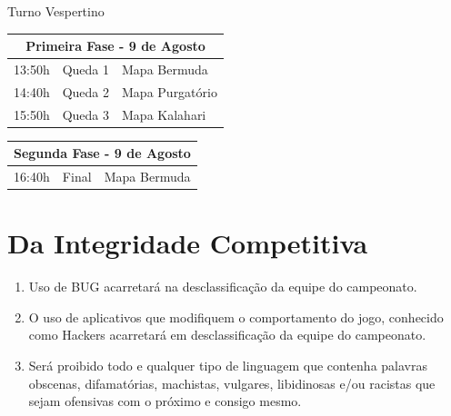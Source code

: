 \begin{enumerate}[start=1,label={\bfseries Art. \arabic*$^\circ$ - }, resume]
    \begin{center}
        Turno Vespertino
    \end{center}
    \begin{multicols}{2}
        \begin{flushleft}
            \begin{tabular}{l l l}
                \hline
                \multicolumn{3}{c}{Primeira Fase - 9 de Agosto}\\
                \hline
                13:50h & Queda 1 & Mapa Bermuda \\
                14:40h & Queda 2 & Mapa Purgatório \\
                15:50h & Queda 3 & Mapa Kalahari\\
                \hline
            \end{tabular}
        \end{flushleft}

        \begin{flushleft}
            \begin{tabular}{l l l}
                \hline
                \multicolumn{3}{c}{Segunda Fase - 9 de Agosto}\\
                \hline
                16:40h & Final & Mapa Bermuda\\
                \hline
            \end{tabular}
        \end{flushleft}
    \end{multicols}
\end{enumerate}

\section*{Da Integridade Competitiva}

\begin{enumerate}[start=1,label={\bfseries Art. \arabic*$^\circ$ - }, resume]
    \item Uso de BUG acarretará na desclassificação da equipe do campeonato.
    \item O uso de aplicativos que modifiquem o comportamento do jogo, conhecido
        como Hackers acarretará em desclassificação da equipe do campeonato.
    \item Será proibido todo e qualquer tipo de linguagem
        que contenha palavras obscenas, difamatórias, machistas, vulgares, libidinosas
        e/ou racistas que sejam ofensivas com o próximo e consigo mesmo.
\end{enumerate}

